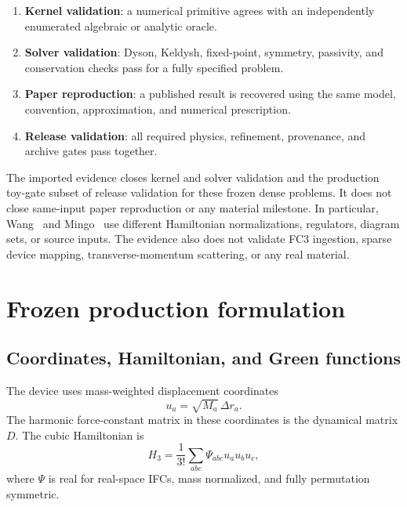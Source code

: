 \documentclass[11pt]{article}
\renewcommand{\_}{\OriginalTextUnderscore\allowbreak}
\begin{document}
\begin{enumerate}
  \item \textbf{Kernel validation}: a numerical primitive agrees with an
  independently enumerated algebraic or analytic oracle.
  \item \textbf{Solver validation}: Dyson, Keldysh, fixed-point, symmetry,
  passivity, and conservation checks pass for a fully specified problem.
  \item \textbf{Paper reproduction}: a published result is recovered using
  the same model, convention, approximation, and numerical prescription.
  \item \textbf{Release validation}: all required physics, refinement,
  provenance, and archive gates pass together.
\end{enumerate}

The imported evidence closes kernel and solver validation and the production
toy-gate subset of release validation for these frozen dense problems. It
does not close same-input paper reproduction or any material milestone. In
particular,
Wang~\cite{wang2006} and Mingo~\cite{mingo2006} use different Hamiltonian
normalizations, regulators, diagram sets, or source inputs. The evidence also
does not validate FC3 ingestion, sparse device mapping, transverse-momentum
scattering, or any real material.

\section{Frozen production formulation}
\label{sec:formalism}

\subsection{Coordinates, Hamiltonian, and Green functions}

The device uses mass-weighted displacement coordinates
\begin{equation}
  u_a=\sqrt{M_a}\,\Delta r_a .
\end{equation}
The harmonic force-constant matrix in these coordinates is the dynamical
matrix \(D\). The cubic Hamiltonian is
\begin{equation}
  H_3=\frac{1}{3!}\sum_{abc}\Psi_{abc}u_au_bu_c ,
  \label{eq:h3}
\end{equation}
where \(\Psi\) is real for real-space IFCs, mass normalized, and fully
permutation symmetric.
\end{document}
